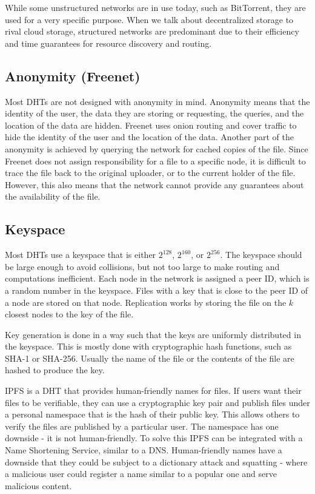 While some unstructured networks are in use today, such as BitTorrent, they are used for a very specific purpose.
When we talk about decentralized storage to rival cloud storage,
structured networks are predominant due to their efficiency and
time guarantees for resource discovery and routing.

\subsection{Anonymity (Freenet)}

Most DHTs are not designed with anonymity in mind.
Anonymity means that the identity of the user, the data they are storing or requesting,
the queries, and the location of the data are hidden.
Freenet \cite{freenet} uses onion routing and cover traffic to hide the identity of the user and the location of the data.
Another part of the anonymity is achieved by querying the network for cached copies of the file.
Since Freenet does not assign responsibility for a file to a specific node, it is difficult to trace the file back to the original uploader,
or to the current holder of the file.
However, this also means that the network cannot provide any guarantees about the availability of the file.


\subsection{Keyspace}

Most DHTs \cite{chord, kademlia, pastry, freenet} use a keyspace that is either $2^{128}$, $2^{160}$, or $2^{256}$.
The keyspace should be large enough to avoid collisions,
but not too large to make routing and computations inefficient.
Each node in the network is assigned a peer ID, which is a random number in the keyspace.
Files with a key that is close to the peer ID of a node are stored on that node.
Replication works by storing the file on the $k$ closest nodes to the key of the file.

Key generation is done in a way such that the keys are uniformly distributed in the keyspace.
This is mostly done with cryptographic hash functions, such as SHA-1 or SHA-256.
Usually the name of the file or the contents of the file are hashed to produce the key.

IPFS is a DHT that provides human-friendly names for files.
If users want their files to be verifiable, they can use a cryptographic key pair
and publish files under a personal namespace that is the hash of their public key.
This allows others to verify the files are published by a particular user.
The namespace has one downside - it is not human-friendly.
To solve this IPFS can be integrated with a Name Shortening Service, similar to a DNS.
Human-friendly names have a downside that they could be subject to a dictionary attack and
squatting - where a malicious user could register a name similar to a popular one and
serve malicious content.

